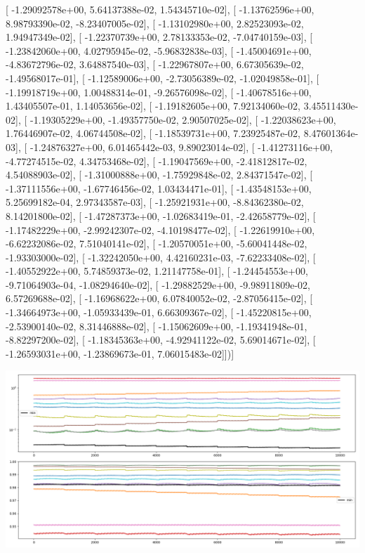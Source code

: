 \documentclass{article}
\begin{document}
       [ -1.29092578e+00,   5.64137388e-02,   1.54345710e-02],
       [ -1.13762596e+00,   8.98793390e-02,  -8.23407005e-02],
       [ -1.13102980e+00,   2.82523093e-02,   1.94947349e-02],
       [ -1.22370739e+00,   2.78133353e-02,  -7.04740159e-03],
       [ -1.23842060e+00,   4.02795945e-02,  -5.96832838e-03],
       [ -1.45004691e+00,  -4.83672796e-02,   3.64887540e-03],
       [ -1.22967807e+00,   6.67305639e-02,  -1.49568017e-01],
       [ -1.12589006e+00,  -2.73056389e-02,  -1.02049858e-01],
       [ -1.19918719e+00,   1.00488314e-01,  -9.26576098e-02],
       [ -1.40678516e+00,   1.43405507e-01,   1.14053656e-02],
       [ -1.19182605e+00,   7.92134060e-02,   3.45511430e-02],
       [ -1.19305229e+00,  -1.49357750e-02,   2.90507025e-02],
       [ -1.22038623e+00,   1.76446907e-02,   4.06744508e-02],
       [ -1.18539731e+00,   7.23925487e-02,   8.47601364e-03],
       [ -1.24876327e+00,   6.01465442e-03,   9.89023014e-02],
       [ -1.41273116e+00,  -4.77274515e-02,   4.34753468e-02],
       [ -1.19047569e+00,  -2.41812817e-02,   4.54088903e-02],
       [ -1.31000888e+00,  -1.75929848e-02,   2.84371547e-02],
       [ -1.37111556e+00,  -1.67746456e-02,   1.03434471e-01],
       [ -1.43548153e+00,   5.25699182e-04,   2.97343587e-03],
       [ -1.25921931e+00,  -8.84362380e-02,   8.14201800e-02],
       [ -1.47287373e+00,  -1.02683419e-01,  -2.42658779e-02],
       [ -1.17482229e+00,  -2.99242307e-02,  -4.10198477e-02],
       [ -1.22619910e+00,  -6.62232086e-02,   7.51040141e-02],
       [ -1.20570051e+00,  -5.60041448e-02,  -1.93303000e-02],
       [ -1.32242050e+00,   4.42160231e-03,  -7.62233408e-02],
       [ -1.40552922e+00,   5.74859373e-02,   1.21147758e-01],
       [ -1.24454553e+00,  -9.71064903e-04,  -1.08294640e-02],
       [ -1.29882529e+00,  -9.98911809e-02,   6.57269688e-02],
       [ -1.16968622e+00,   6.07840052e-02,  -2.87056415e-02],
       [ -1.34664973e+00,  -1.05933439e-01,   6.66309367e-02],
       [ -1.45220815e+00,  -2.53900140e-02,   8.31446888e-02],
       [ -1.15062609e+00,  -1.19341948e-01,  -8.82297200e-02],
       [ -1.18345363e+00,  -4.92941122e-02,   5.69014671e-02],
       [ -1.26593031e+00,  -1.23869673e-01,   7.06015483e-02]])]
\begin{center}
\includegraphics[scale=.9]{report_pickled_controls3/control_dpn_all}

\end{center}
\end{document}
